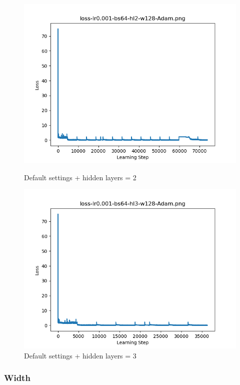 \documentclass{article}[12pt]
\begin{document}
        \begin{figure}[H]
        \includegraphics[width=\linewidth]{testsResults/loss/hl/def.png}
        \caption{Default settings + hidden layers = 2}
        \endminipage
        \includegraphics[width=\linewidth]{testsResults/loss/hl/loss-lr0.001-bs64-hl3-w128-Adam.png}
        \caption{Default settings + hidden layers = 3}
        \endminipage
    \end{figure}
    \newpage
\subsubsection{Width}
\end{document}

